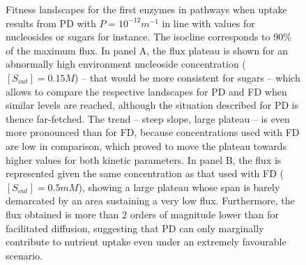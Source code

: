 \begin{figure}[htb!]
\caption{Fitness landscapes for the first enzymes in pathways when uptake results from PD with $P=10^{-12}m^{-1}$\citep{Wood68,Chakrabarti94} in line with values for nucleosides or sugars for instance. The isocline corresponds to 90\% of the maximum flux. In panel A, the flux plateau is shown for an abnormally high environment nucleoside concentration ($[S_{out}]=0.15M$) -- that would be more consistent for sugars -- which allows to compare the respective landscapes for PD and FD when similar levels are reached, although the situation described for PD is thence far-fetched. The trend -- steep slope, large plateau -- is even more pronounced than for FD, because concentrations used with FD are low in comparison, which proved to move the plateau towards higher values for both kinetic parameters. In panel B, the flux is represented given the same concentration as that used with FD ($[S_{out}]=0.5mM$), showing a large plateau whose span is barely demarcated by an area sustaining a very low flux. Furthermore, the flux obtained is more than 2 orders of magnitude lower than for facilitated diffusion, suggesting that PD can only marginally contribute to nutrient uptake even under an extremely favourable scenario.}
\label{fig1-ann}
\end{figure}

